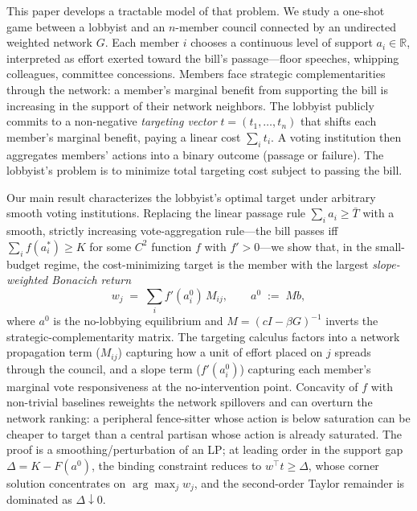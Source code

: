 \documentclass[11pt,letterpaper]{article}
\theoremstyle{plain}
\theoremstyle{definition}
\theoremstyle{remark}
\begin{document}
This paper develops a tractable model of that problem. We study a one-shot game between a lobbyist and an $n$-member council connected by an undirected weighted network $G$. Each member $i$ chooses a continuous level of support $a_i \in \mathbb{R}$, interpreted as effort exerted toward the bill's passage---floor speeches, whipping colleagues, committee concessions. Members face strategic complementarities through the network: a member's marginal benefit from supporting the bill is increasing in the support of their network neighbors. The lobbyist publicly commits to a non-negative \emph{targeting vector} $t = (t_1, \ldots, t_n)$ that shifts each member's marginal benefit, paying a linear cost $\sum_i t_i$. A voting institution then aggregates members' actions into a binary outcome (passage or failure). The lobbyist's problem is to minimize total targeting cost subject to passing the bill.

Our main result characterizes the lobbyist's optimal target under arbitrary smooth voting institutions. Replacing the linear passage rule $\sum_i a_i \geq \bar T$ with a smooth, strictly increasing vote-aggregation rule---the bill passes iff $\sum_i f(a_i^*) \geq K$ for some $C^2$ function $f$ with $f' > 0$---we show that, in the small-budget regime, the cost-minimizing target is the member with the largest \emph{slope-weighted Bonacich return}
\[
w_j \;=\; \sum_i f'(a_i^0)\, M_{ij}, \qquad a^0 \;:=\; M b,
\]
where $a^0$ is the no-lobbying equilibrium and $M = (cI - \beta G)^{-1}$ inverts the strategic-complementarity matrix. The targeting calculus factors into a network propagation term ($M_{ij}$) capturing how a unit of effort placed on $j$ spreads through the council, and a slope term ($f'(a_i^0)$) capturing each member's marginal vote responsiveness at the no-intervention point. Concavity of $f$ with non-trivial baselines reweights the network spillovers and can overturn the network ranking: a peripheral fence-sitter whose action is below saturation can be cheaper to target than a central partisan whose action is already saturated. The proof is a smoothing/perturbation of an LP; at leading order in the support gap $\Delta = K - F(a^0)$, the binding constraint reduces to $w^\top t \geq \Delta$, whose corner solution concentrates on $\arg\max_j w_j$, and the second-order Taylor remainder is dominated as $\Delta \downarrow 0$.
\end{document}
